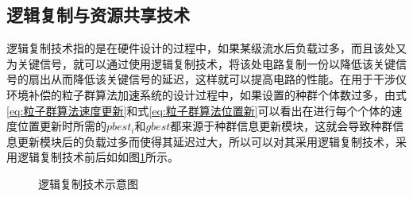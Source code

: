   \subsection{逻辑复制与资源共享技术}
  逻辑复制技术指的是在硬件设计的过程中，如果某级流水后负载过多，而且该处又为关键信号，就可以通过使用逻辑复制技术，将该处电路复制一份以降低该关键信号的扇出从而降低该关键信号的延迟，这样就可以提高电路的性能。在用于干涉仪环境补偿的粒子群算法加速系统的设计过程中，如果设置的种群个体数过多，由式\eqref{eq:粒子群算法速度更新}和式\eqref{eq:粒子群算法位置新}可以看出在进行每个个体的速度位置更新时所需的$pbest_i$和$gbest$都来源于种群信息更新模块，这就会导致种群信息更新模块后的负载过多而使得其延迟过大，所以可以对其采用逻辑复制技术，采用逻辑复制技术前后如如图\ref{fig:逻辑复制技术示意图}所示。
  \begin{figure}[htb]
    \centering
    \caption{逻辑复制技术示意图}
    \label{fig:逻辑复制技术示意图}
  \end{figure}

